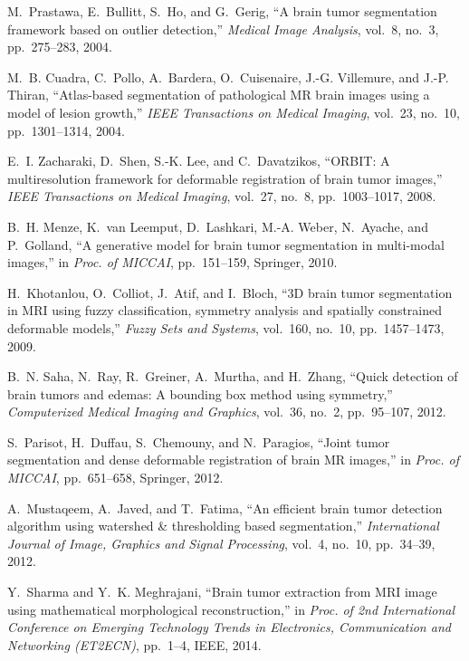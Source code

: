 \documentclass[journal,twocolumn]{IEEEtran}
\begin{document}
\begin{thebibliography}{10}
M.~Prastawa, E.~Bullitt, S.~Ho, and G.~Gerig, ``{A brain tumor segmentation
  framework based on outlier detection},'' {\em Medical Image Analysis},
  vol.~8, no.~3, pp.~275--283, 2004.

M.~B. Cuadra, C.~Pollo, A.~Bardera, O.~Cuisenaire, J.-G. Villemure, and J.-P.
  Thiran, ``{Atlas-based segmentation of pathological MR brain images using a
  model of lesion growth},'' {\em IEEE Transactions on Medical Imaging},
  vol.~23, no.~10, pp.~1301--1314, 2004.

E.~I. Zacharaki, D.~Shen, S.-K. Lee, and C.~Davatzikos, ``{ORBIT: A
  multiresolution framework for deformable registration of brain tumor
  images},'' {\em IEEE Transactions on Medical Imaging}, vol.~27, no.~8,
  pp.~1003--1017, 2008.

B.~H. Menze, K.~{van Leemput}, D.~Lashkari, M.-A. Weber, N.~Ayache, and
  P.~Golland, ``{A generative model for brain tumor segmentation in multi-modal
  images},'' in {\em Proc. of MICCAI}, pp.~151--159, Springer, 2010.

H.~Khotanlou, O.~Colliot, J.~Atif, and I.~Bloch, ``{3D brain tumor segmentation
  in MRI using fuzzy classification, symmetry analysis and spatially
  constrained deformable models},'' {\em Fuzzy Sets and Systems}, vol.~160,
  no.~10, pp.~1457--1473, 2009.

B.~N. Saha, N.~Ray, R.~Greiner, A.~Murtha, and H.~Zhang, ``{Quick detection of
  brain tumors and edemas: A bounding box method using symmetry},'' {\em
  Computerized Medical Imaging and Graphics}, vol.~36, no.~2, pp.~95--107,
  2012.

S.~Parisot, H.~Duffau, S.~Chemouny, and N.~Paragios, ``{Joint tumor
  segmentation and dense deformable registration of brain MR images},'' in {\em
  Proc. of MICCAI}, pp.~651--658, Springer, 2012.

A.~Mustaqeem, A.~Javed, and T.~Fatima, ``{An efficient brain tumor detection
  algorithm using watershed {\&} thresholding based segmentation},'' {\em
  International Journal of Image, Graphics and Signal Processing}, vol.~4,
  no.~10, pp.~34--39, 2012.

Y.~Sharma and Y.~K. Meghrajani, ``{Brain tumor extraction from MRI image using
  mathematical morphological reconstruction},'' in {\em Proc. of 2nd
  International Conference on Emerging Technology Trends in Electronics,
  Communication and Networking (ET2ECN)}, pp.~1--4, IEEE, 2014.


\end{thebibliography}
\end{document}
